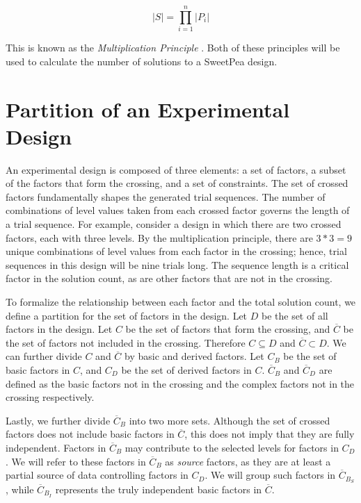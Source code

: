 \[
|S| = \prod_{i=1}^n |P_i|
\]

This is known as the \textit{Multiplication Principle} \cite{brualdi_introductory_2010}. Both of these principles will be used to calculate the number of solutions to a SweetPea design.


\section{Partition of an Experimental Design}

An experimental design is composed of three elements: a set of factors, a subset of the factors that form the crossing, and a set of constraints. The set of crossed factors fundamentally shapes the generated trial sequences. The number of combinations of level values taken from each crossed factor governs the length of a trial sequence. For example, consider a design in which there are two crossed factors, each with three levels. By the multiplication principle, there are $3 * 3 = 9$ unique combinations of level values from each factor in the crossing; hence, trial sequences in this design will be nine trials long. The sequence length is a critical factor in the solution count, as are other factors that are not in the crossing.

To formalize the relationship between each factor and the total solution count, we define a partition for the set of factors in the design. Let $D$ be the set of all factors in the design. Let $C$ be the set of factors that form the crossing, and $\overline{C}$ be the set of factors not included in the crossing. Therefore $C \subseteq D$ and $\overline{C} \subset D$. We can further divide $C$ and $\overline{C}$ by basic and derived factors. Let $C_B$ be the set of basic factors in $C$, and $C_D$ be the set of derived factors in $C$. $\overline{C}_B$ and $\overline{C}_D$ are defined as the basic factors not in the crossing and the complex factors not in the crossing respectively.

Lastly, we further divide $\overline{C}_B$ into two more sets. Although the set of crossed factors does not include basic factors in $\overline{C}$, this does not imply that they are fully independent. Factors in $\overline{C}_B$ may contribute to the selected levels for factors in $C_D$. We will refer to these factors in $\overline{C}_B$ as \textit{source} factors, as they are at least a partial source of data controlling factors in $C_D$. We will group such factors in $\overline{C}_{B_S}$, while $\overline{C}_{B_I}$ represents the truly independent basic factors in $\overline{C}$.

